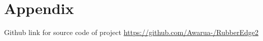\section{Appendix}
Github link for source code of project \url{https://github.com/Awarua-/RubberEdge2}